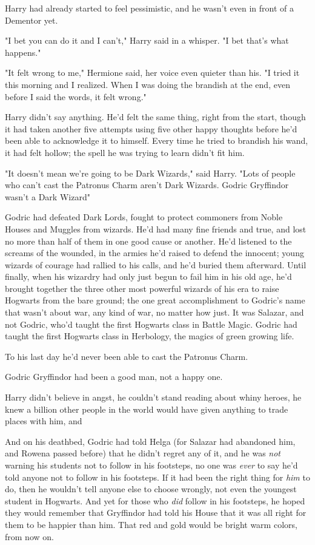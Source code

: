 Harry had already started to feel pessimistic, and he wasn't even in front of a
Dementor yet.

"I bet you can do it and I can't," Harry said in a whisper. "I bet that's what
happens."

"It felt wrong to me," Hermione said, her voice even quieter than his. "I tried
it this morning and I realized. When I was doing the brandish at the end, even
before I said the words, it felt wrong."

Harry didn't say anything. He'd felt the same thing, right from the start,
though it had taken another five attempts using five other happy thoughts
before he'd been able to acknowledge it to himself. Every time he tried to
brandish his wand, it had felt hollow; the spell he was trying to learn didn't
fit him.

"It doesn't mean we're going to be Dark Wizards," said Harry. "Lots of people
who can't cast the Patronus Charm aren't Dark Wizards. Godric Gryffindor wasn't
a Dark Wizard{\el}"

Godric had defeated Dark Lords, fought to protect commoners from Noble Houses
and Muggles from wizards. He'd had many fine friends and true, and lost no more
than half of them in one good cause or another. He'd listened to the screams of
the wounded, in the armies he'd raised to defend the innocent; young wizards of
courage had rallied to his calls, and he'd buried them afterward. Until
finally, when his wizardry had only just begun to fail him in his old age, he'd
brought together the three other most powerful wizards of his era to raise
Hogwarts from the bare ground; the one great accomplishment to Godric's name
that wasn't about war, any kind of war, no matter how just. It was Salazar, and
not Godric, who'd taught the first Hogwarts class in Battle Magic. Godric had
taught the first Hogwarts class in Herbology, the magics of green growing life.

To his last day he'd never been able to cast the Patronus Charm.

Godric Gryffindor had been a good man, not a happy one.

Harry didn't believe in angst, he couldn't stand reading about whiny heroes, he
knew a billion other people in the world would have given anything to trade
places with him, and{\el}

And on his deathbed, Godric had told Helga (for Salazar had abandoned him, and
Rowena passed before) that he didn't regret any of it, and he was \emph{not}
warning his students not to follow in his footsteps, no one was \emph{ever} to
say he'd told anyone not to follow in his footsteps. If it had been the right
thing for \emph{him} to do, then he wouldn't tell anyone else to choose
wrongly, not even the youngest student in Hogwarts. And yet for those who
\emph{did} follow in his footsteps, he hoped they would remember that
Gryffindor had told his House that it was all right for them to be happier than
him. That red and gold would be bright warm colors, from now on.


